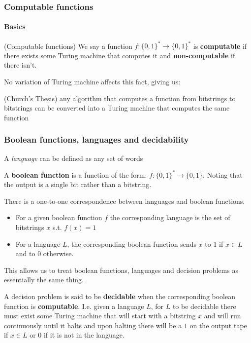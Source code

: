 \message{ !name(AlgComplexAllFlashCards.tex)}\documentclass{beamer}
\begin{document}
\begin{frame}
  \frametitle{Computable functions}
  \framesubtitle{Basics}

  \begin{definition}(Computable functions)
    We say a function $f : \{ 0,1 \} ^{*} \rightarrow \{ 0,1 \} ^{*}$ is \textbf{computable} if there exists some Turing machine that computes it and \textbf{non-computable} if there isn't.
  \end{definition}

  No variation of Turing machine affects this fact, giving us:

  \begin{thesis}(Church's Thesis)
    any algorithm that computes a function from bitstrings to bitstrings can be converted into a Turing machine that computes the same function
  \end{thesis}
\end{frame}

\begin{frame}[allowframebreaks]
  \frametitle{Boolean functions, languages and decidability}

  \begin{definition}
    A \textit{language} can be defined as any set of words
  \end{definition}

  \begin{definition}
    A \textbf{boolean function} is a function of the form: $f : \{ 0,1 \}^{*} \rightarrow \{ 0,1 \} $. Noting that the output is a single bit rather than a bitstring.
  \end{definition}

  There is a one-to-one correspondence between languages and boolean functions.
\begin{itemize}
  \item For a given boolean function $f$ the corresponding language is the set of bitstrings $x$ s.t. $f(x) = 1$
  \item For a language $L$, the corresponding boolean function sends $x$ to 1 if $x \in L$ and to $0$ otherwise.
\end{itemize}

This allows us to treat boolean functions, languages and decision problems as essentially the same thing.

A decision problem is said to be \textbf{decidable} when the corresponding boolean function is \textbf{computable}. I.e. given a language $L$, for $L$ to be decidable there must exist some Turing machine that will start with a bitstring $x$ and will run continuously until it halts and upon halting there will be a $1$ on the output tape if $x \in L$ or $0$ if it is not in the language.
\end{frame}
\end{document}
